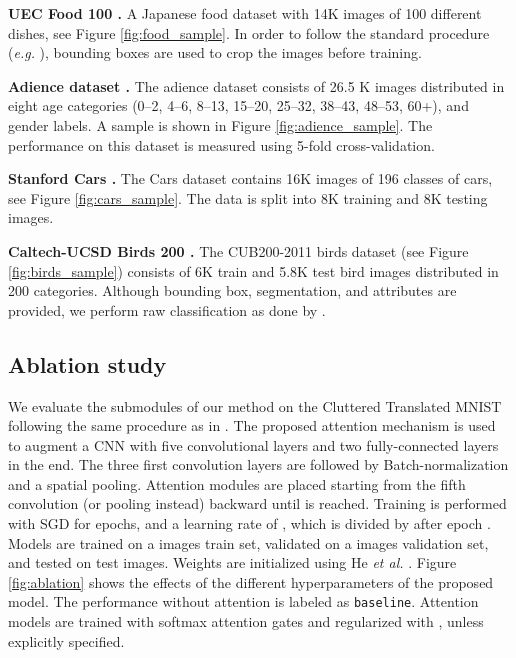 \documentclass[runningheads]{llncs}
\begin{document}
\medskip
\noindent\textbf{UEC Food 100 \cite{matsuda12}.} A Japanese food dataset with 14K images of 100 different dishes, see Figure \ref{fig:food_sample}. In order to follow the standard procedure (\emph{e.g.}  \cite{chen2016deep,hassannejad2016food}), bounding boxes are used to crop the images before training.

\medskip
\noindent\textbf{Adience dataset \cite{eidinger2014age}.} The adience dataset consists of 26.5 K images distributed in eight age categories (0–2, 4–6, 8–13, 15–20, 25–32, 38–43, 48–53, 60+), and gender labels. A sample is shown in Figure \ref{fig:adience_sample}.
The performance on this dataset is measured using 5-fold cross-validation.

\medskip
\noindent\textbf{Stanford Cars \cite{krause20133d}.}
The Cars dataset contains 16K images of 196 classes of cars, see Figure \ref{fig:cars_sample}. The data is split into 8K training and 8K testing images.

\medskip
\noindent\textbf{Caltech-UCSD Birds 200 \cite{WahCUB_200_2011}.}
The CUB200-2011 birds dataset (see Figure \ref{fig:birds_sample}) consists of 6K train and 5.8K test bird images distributed in 200 categories. Although bounding box, segmentation, and attributes are provided, we perform raw classification as done by \cite{jaderberg2015spatial}. 

\subsection{Ablation study}
\label{sect:ablation}
We evaluate the submodules of our method on the Cluttered Translated MNIST following the same procedure as in \cite{mnih2014recurrent}. The proposed attention mechanism is used to augment a CNN with five  convolutional layers and two fully-connected layers in the end. The three first convolution layers are followed by Batch-normalization and a spatial pooling. Attention modules are placed starting from the fifth convolution (or pooling instead) backward until  is reached. Training is performed with SGD for  epochs, and a learning rate of , which is divided by  after epoch . Models are trained on a  images train set, validated on a  images validation set, and tested on  test images. Weights are initialized using He \emph{et al.}  \cite{he2015delving}. Figure \ref{fig:ablation} shows the effects of the different hyperparameters of the proposed model. The performance without attention is labeled as \texttt{baseline}. Attention models are trained with softmax attention gates and regularized with \cite{zhao2017diversified}, unless explicitly specified.
\end{document}
